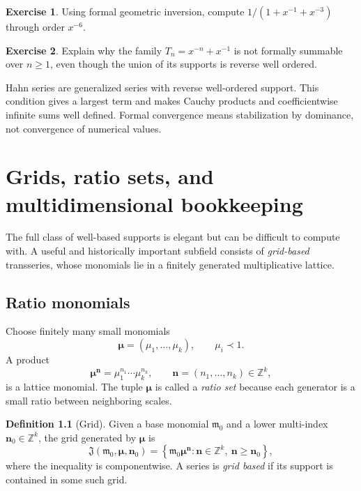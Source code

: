 \documentclass[11pt,openany]{book}
\theoremstyle{definition}
\newtheorem{definition}{Definition}[chapter]
\newtheorem{exercise}{Exercise}[chapter]
\theoremstyle{plain}
\theoremstyle{remark}
\newcommand{\Z}{\mathbb{Z}}
\newcommand{\m}{\mathfrak{m}}
\newcommand{\precdom}{\prec}
\begin{document}
\begin{exercise}
Using formal geometric inversion, compute $1/(1+x^{-1}+x^{-3})$ through order $x^{-6}$.
\end{exercise}

\begin{exercise}
Explain why the family $T_n=x^{-n}+x^{-1}$ is not formally summable over $n\ge1$, even though the union of its supports is reverse well ordered.
\end{exercise}

\begin{summarybox}
Hahn series are generalized series with reverse well-ordered support. This condition gives a largest term and makes Cauchy products and coefficientwise infinite sums well defined. Formal convergence means stabilization by dominance, not convergence of numerical values.
\end{summarybox}


\chapter{Grids, ratio sets, and multidimensional bookkeeping}\label{ch:grids}

The full class of well-based supports is elegant but can be difficult to compute with. A useful and historically important subfield consists of \emph{grid-based} transseries, whose monomials lie in a finitely generated multiplicative lattice.

\section{Ratio monomials}

Choose finitely many small monomials
\[
 \boldsymbol\mu=(\mu_1,\ldots,\mu_k),
 \qquad \mu_i\precdom1.
\]
A product
\[
 \boldsymbol\mu^{\mathbf n}
 =\mu_1^{n_1}\cdots\mu_k^{n_k},
 \qquad \mathbf n=(n_1,\ldots,n_k)\in\Z^k,
\]
is a lattice monomial. The tuple $\boldsymbol\mu$ is called a \emph{ratio set} because each generator is a small ratio between neighboring scales.

\begin{definition}[Grid]
Given a base monomial $\m_0$ and a lower multi-index
$\mathbf n_0\in\Z^k$, the grid generated by $\boldsymbol\mu$ is
\[
 \mathfrak J(\m_0,\boldsymbol\mu,\mathbf n_0)
 =\left\{\m_0\boldsymbol\mu^{\mathbf n}:
 \mathbf n\in\Z^k,\ \mathbf n\ge\mathbf n_0\right\},
\]
where the inequality is componentwise.
A series is \emph{grid based} if its support is contained in some such grid.
\end{definition}
\end{document}
